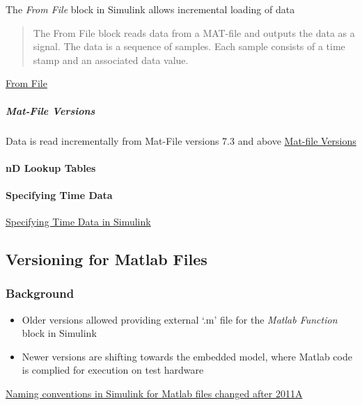 \documentclass[]{article}
\providecommand{\tightlist}{%
  \setlength{\itemsep}{0pt}\setlength{\parskip}{0pt}}
\let\oldparagraph\paragraph
\renewcommand{\paragraph}[1]{\oldparagraph{#1}\mbox{}}
\let\oldsubparagraph\subparagraph
\renewcommand{\subparagraph}[1]{\oldsubparagraph{#1}\mbox{}}
\begin{document}
The \emph{From File} block in Simulink allows incremental loading of
data

\begin{quote}
The From File block reads data from a MAT-file and outputs the data as a
signal. The data is a sequence of samples. Each sample consists of a
time stamp and an associated data value.
\end{quote}

\href{http://www.mathworks.com/help/simulink/slref/fromfile.html}{From
File}

\subparagraph{Mat-File Versions}\label{mat-file-versions}

Data is read incrementally from Mat-File versions 7.3 and above
\href{http://www.mathworks.com/help/matlab/import_export/mat-file-versions.html}{Mat-file
Versions}

\paragraph{nD Lookup Tables}\label{nd-lookup-tables}

\paragraph{Specifying Time Data}\label{specifying-time-data}

\href{http://www.mathworks.com/help/simulink/ug/importing-data-structures-to-a-root-level-input-port.html\#bsuwoyk}{Specifying
Time Data in Simulink}

\subsection{Versioning for Matlab
Files}\label{versioning-for-matlab-files}

\subsubsection{Background}\label{background}

\begin{itemize}
\tightlist
\item
  Older versions allowed providing external `.m' file for the
  \emph{Matlab Function} block in Simulink
\item
  Newer versions are shifting towards the embedded model, where Matlab
  code is complied for execution on test hardware
\end{itemize}

\href{http://www.goddardconsulting.ca/simulink-using-embedded-matlab.html}{Naming
conventions in Simulink for Matlab files changed after 2011A}
\end{document}
